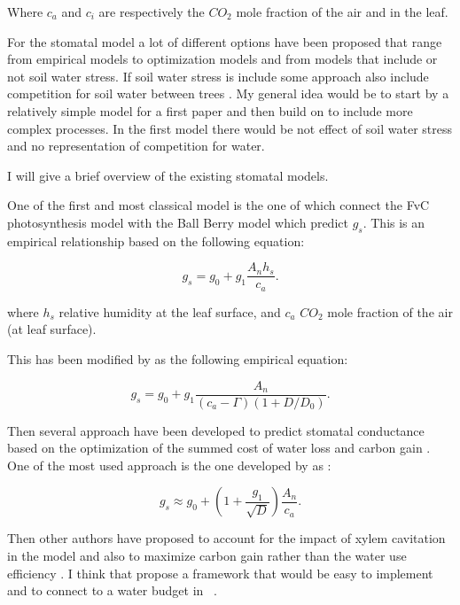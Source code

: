 \documentclass[a4paper,11pt]{article}
\begin{document}
Where $c_a$ and $c_i$ are respectively the $CO_2$ mole fraction of the air and in the leaf.


For the stomatal model a lot of different options have been proposed that range from empirical models to optimization models and from models that include or not soil water stress. If soil water stress is include some approach also include competition for soil water between trees \citep{Farrior-2013}. My general idea would be to start by a relatively simple model for a first paper and then build on to include more complex processes. In the first model there would be not effect of soil water stress and no representation of competition for water.

I will give a brief overview of the existing stomatal models.

One of the first and most classical model is the one of \citet{Collatz-1991} which connect the FvC photosynthesis model with the Ball Berry model which predict $g_s$. This is an empirical relationship based on the following equation:

\begin{equation}
\label{eq:gs-Ball}
g_s= g_0 + g_1 \frac{A_n h_s}{c_a}.
\end{equation}

where $h_s$ relative humidity at the leaf surface, and $c_a$ $CO_2$ mole fraction of the air (at leaf surface).

This has been modified by \citet{Leuning-1995} as the following empirical equation:

\begin{equation}
\label{eq:gs-Leuning}
g_s= g_0 + g_1 \frac{A_n }{(c_a - \Gamma)(1+D/D_0)}.
\end{equation}

Then several approach have been developed to predict stomatal conductance based on the optimization of the summed cost of water loss and carbon gain \citep{Medlyn-2002,Prentice-2014,Wolf-2016,Sperry-2017}. One of the most used approach is the one developed by \citet{Medlyn-2011} as :

\begin{equation}
\label{eq:gs-Medlyn}
g_s \approx g_0 + (1 + \frac{g_1}{\sqrt{D}}) \frac{A_n }{c_a}.
\end{equation}


Then other authors have proposed to account for the impact of xylem cavitation \citet{Wolf-2016,Sperry-2016,Sperry-2017} in the model and also to maximize carbon gain rather than the water use efficiency \citet{Wolf-2016}. I think that \citep{Sperry-2016} propose a framework that would be easy to implement and to connect to a water budget in \plant\ .
\end{document}
